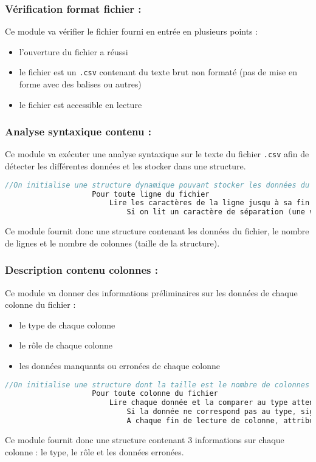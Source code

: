 			\subsubsection{Vérification format fichier :}
				Ce module va vérifier le fichier fourni en entrée en plusieurs points :
				\begin{itemize}
					\item l'ouverture du fichier a réussi
					\item le fichier est un \lstinline!.csv! contenant du texte brut non formaté (pas de mise en forme avec des balises ou autres)
					\item le fichier est accessible en lecture
				\end{itemize}
			
			\subsubsection{Analyse syntaxique contenu :}
				Ce module va exécuter une analyse syntaxique sur le texte du fichier \lstinline!.csv! afin de détecter les différentes données et les stocker dans une structure.
				\begin{lstlisting}[language=C]
					//On initialise une structure dynamique pouvant stocker les données du fichier (tableau 2D dynamique ou liste de listes)
					Pour toute ligne du fichier
						Lire les caractères de la ligne jusqu à sa fin
							Si on lit un caractère de séparation (une virgule, un point-virgule ou une tabulation) ou une fin de ligne, on stocke les caractères lus dans la case correspondante de la structure
				\end{lstlisting}
				Ce module fournit donc une structure contenant les données du fichier, le nombre de lignes et le nombre de colonnes (taille de la structure).
				
			\subsubsection{Description contenu colonnes :}
				Ce module va donner des informations préliminaires sur les données de chaque colonne du fichier :
				\begin{itemize}
					\item le type de chaque colonne
					\item le rôle de chaque colonne
					\item les données manquants ou erronées de chaque colonne
				\end{itemize}
				\begin{lstlisting}[language=C]
					//On initialise une structure dont la taille est le nombre de colonnes qui contient 3 champs
					Pour toute colonne du fichier
						Lire chaque donnée et la comparer au type attendu
							Si la donnée ne correspond pas au type, signaler dans la structure une donnée erronée
							A chaque fin de lecture de colonne, attribuer un rôle à celle-ci
				\end{lstlisting}
				Ce module fournit donc une structure contenant 3 informations sur chaque colonne : le type, le rôle et les données erronées.

